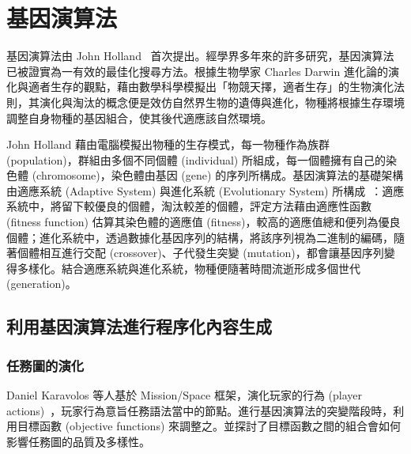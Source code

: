 

\section{基因演算法}
\label{sec:relatedworks-ga}

基因演算法由 John Holland~\cite{holland1992adaptation} 首次提出。經學界多年來的許多研究，基因演算法已被證實為一有效的最佳化搜尋方法。根據生物學家 Charles Darwin 進化論的演化與適者生存的觀點，藉由數學科學模擬出「物競天擇，適者生存」的生物演化法則，其演化與淘汰的概念便是效仿自然界生物的遺傳與進化，物種將根據生存環境調整自身物種的基因組合，使其後代適應該自然環境。

John Holland 藉由電腦模擬出物種的生存模式，每一物種作為族群 (population)，群組由多個不同個體 (individual) 所組成，每一個體擁有自己的染色體 (chromosome)，染色體由基因 (gene) 的序列所構成。基因演算法的基礎架構由適應系統 (Adaptive System) 與進化系統 (Evolutionary System) 所構成~\cite{holland1992adaptation}：適應系統中，將留下較優良的個體，淘汰較差的個體，評定方法藉由適應性函數 (fitness function) 估算其染色體的適應值 (fitness)，較高的適應值總和便列為優良個體；進化系統中，透過數據化基因序列的結構，將該序列視為二進制的編碼，隨著個體相互進行交配 (crossover)、子代發生突變 (mutation)，都會讓基因序列變得多樣化。結合適應系統與進化系統，物種便隨著時間流逝形成多個世代 (generation)。


\subsection{利用基因演算法進行程序化內容生成}
\label{ssec:relatedworks-ga-forpcg}

\subsubsection{任務圖的演化}
\label{sssec:relatedworks-ga-forpcg-missiongraph}

Daniel Karavolos 等人基於 Mission/Space 框架，演化玩家的行為 (player actions)~\cite{karavolos2016evolving}，玩家行為意旨任務語法當中的節點。進行基因演算法的突變階段時，利用目標函數 (objective functions) 來調整之。並探討了目標函數之間的組合會如何影響任務圖的品質及多樣性。

